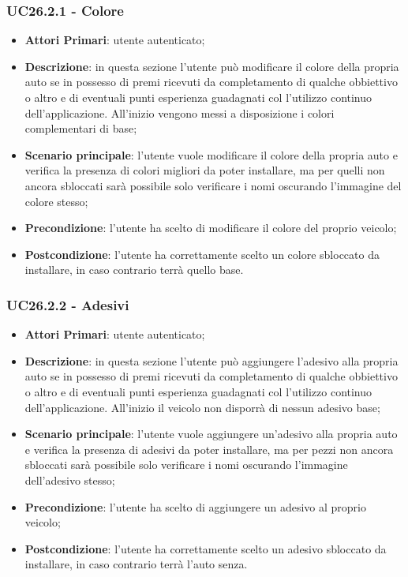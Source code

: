 \subsubsection{UC26.2.1 - Colore}
\begin{itemize}
	\item \textbf{Attori Primari}: utente autenticato;
	\item \textbf{Descrizione}: in questa sezione l'utente può modificare il colore della propria auto se in possesso di premi ricevuti da completamento di qualche obbiettivo o altro e di eventuali punti esperienza guadagnati col l'utilizzo continuo dell'applicazione.
	All'inizio vengono messi a disposizione i colori complementari di base;
	\item \textbf{Scenario principale}: l'utente vuole modificare il colore della propria auto e verifica la presenza di colori migliori da poter installare, ma per quelli non ancora sbloccati sarà possibile solo verificare i nomi oscurando l'immagine del colore stesso;
	\item \textbf{Precondizione}: l'utente ha scelto di modificare il colore del proprio veicolo; 
	\item \textbf{Postcondizione}: l'utente ha correttamente scelto un colore sbloccato da installare, in caso contrario terrà quello base.
\end{itemize}
\subsubsection{UC26.2.2 - Adesivi}
\begin{itemize}
	\item \textbf{Attori Primari}: utente autenticato;
	\item \textbf{Descrizione}: in questa sezione l'utente può aggiungere l'adesivo alla propria auto se in possesso di premi ricevuti da completamento di qualche obbiettivo o altro e di eventuali punti esperienza guadagnati col l'utilizzo continuo dell'applicazione.
	All'inizio il veicolo non disporrà di nessun adesivo base;
	\item \textbf{Scenario principale}: l'utente vuole aggiungere un'adesivo alla propria auto e verifica la presenza di adesivi da poter installare, ma per pezzi non ancora sbloccati sarà possibile solo verificare i nomi oscurando l'immagine dell'adesivo stesso;
	\item \textbf{Precondizione}: l'utente ha scelto di aggiungere un adesivo al proprio veicolo; 
	\item \textbf{Postcondizione}: l'utente ha correttamente scelto un adesivo sbloccato da installare, in caso contrario terrà l'auto senza.
\end{itemize}
